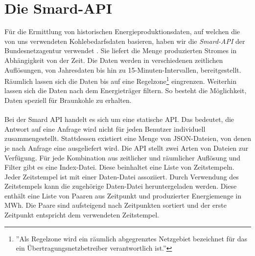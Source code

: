 \section{Die Smard-API}

Für die Ermittlung von historischen Energieproduktionsdaten, auf welchen die von uns verwendeten Kohlebedarfsdaten basieren, haben wir die \emph{Smard-API} der Bundesnetzagentur verwendet \cite{noauthor_bundesapismard-api_nodate}. Sie liefert die Menge produzierten Stromes in Abhängigkeit von der Zeit. Die Daten werden in verschiedenen zeitlichen Auflösungen, von Jahresdaten bis hin zu 15-Minuten-Intervallen, bereitgestellt. Räumlich lassen sich die Daten bis auf eine Regelzone\footnote{''Als Regelzone wird ein räumlich abgegrenztes Netzgebiet bezeichnet für das ein Übertragungsnetzbetreiber verantwortlich ist.''\cite{noauthor_smard_nodate}} eingrenzen. Weiterhin lassen sich die Daten nach dem Energieträger filtern. So besteht die Möglichkeit, Daten speziell für Braunkohle zu erhalten.\\
\\
Bei der Smard API handelt es sich um eine statische API. Das bedeutet, die Antwort auf eine Anfrage wird nicht für jeden Benutzer individuell zusammengestellt. Stattdessen existiert eine Menge von JSON-Dateien, von denen je nach Anfrage eine ausgeliefert wird. Die API stellt zwei Arten von Dateien zur Verfügung. Für jede Kombination aus zeitlicher und räumlicher Auflösung und Filter gibt es eine Index-Datei. Diese beinhaltet eine Liste von Zeitstempeln. Jeder Zeitstempel ist mit einer Daten-Datei assoziiert. Durch Verwendung des Zeitstempels kann die zugehörige Daten-Datei heruntergeladen werden. Diese enthält eine Liste von Paaren aus Zeitpunkt und produzierter Energiemenge in MWh. Die Paare sind aufsteigend nach Zeitpunkten sortiert und der erste Zeitpunkt entspricht dem verwendeten Zeitstempel.